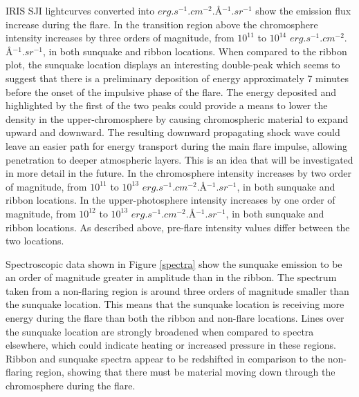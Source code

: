IRIS SJI lightcurves converted into $erg.s^{-1}.cm^{-2}.$\AA$^{-1}.sr^{-1}$ show the emission flux increase during the flare. In the transition region above the chromosphere intensity increases by three orders of magnitude, from $10^{11}$ to $10^{14}$ $erg.s^{-1}.cm^{-2}.$\AA$^{-1}.sr^{-1}$, in both sunquake and ribbon locations. When compared to the ribbon plot, the sunquake location displays an interesting double-peak which seems to suggest that there is a preliminary deposition of energy approximately 7 minutes before the onset of the impulsive phase of the flare. The energy deposited and highlighted by the first of the two peaks could provide a means to lower the density in the upper-chromosphere by causing chromospheric material to expand upward and downward. The resulting downward propagating shock wave could leave an easier path for energy transport during the main flare impulse, allowing penetration to deeper atmospheric layers. This is an idea that will be investigated in more detail in the future. In the chromosphere intensity increases by two order of magnitude, from $10^{11}$ to $10^{13}$ $erg.s^{-1}.cm^{-2}.$\AA$^{-1}.sr^{-1}$, in both sunquake and ribbon locations. In the upper-photosphere intensity increases by one order of magnitude, from $10^{12}$ to $10^{13}$ $erg.s^{-1}.cm^{-2}.$\AA$^{-1}.sr^{-1}$, in both sunquake and ribbon locations. As described above, pre-flare intensity values differ between the two locations.

Spectroscopic data shown in Figure \ref{spectra} show the sunquake emission to be an order of magnitude greater in amplitude than in the ribbon. The spectrum taken from a non-flaring region is around three orders of magnitude smaller than the sunquake location. This means that the sunquake location is receiving more energy during the flare than both the ribbon and non-flare locations. Lines over the sunquake location are strongly broadened when compared to spectra elsewhere, which could indicate heating or increased pressure in these regions. Ribbon and sunquake spectra appear to be redshifted in comparison to the non-flaring region, showing that there must be material moving down through the chromosphere during the flare.\\


